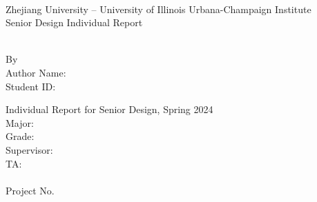 \documentclass[../individual_thesis.tex]{subfiles}
\begin{document}
\begin{titlepage}
    \begin{center}
        ~~\\ %
        \vspace{1.5cm}
        {\fontsize{16}{24}\selectfont Zhejiang University -- University of Illinois Urbana-Champaign Institute}\\
        \vspace{1.88cm}
        {\fontsize{28}{42}\selectfont Senior Design Individual Report}\\
        \vspace{1.6cm}
        \begin{minipage}{15.92cm}
            \centering
            \fontsize{26}{26}\selectfont
            \MakeUppercase{\bf \RPTTITLE}
        \end{minipage}\\[2cm]
        {\fontsize{14}{21}\selectfont By}\\[1.5em]
        {\fontsize{14}{21}\selectfont Author Name: \AUTHORNAME}\\
        {\fontsize{14}{21}\selectfont Student ID: \STUDENTID}

        \vfill
        {\fontsize{12}{\baselineskip}\selectfont Individual Report for Senior Design, Spring 2024\\
            Major: \MAJOR \\
            Grade: \GRADE \\
            Supervisor: \FACULTYNAME \\
            TA:~ \TANAME\\
            \vfill}
        {\fontsize{12}{18}\selectfont\RPTDATE\\
            Project No. \PROJNBR}
    \end{center}
    \vspace{2cm}
    ~
    \restoregeometry
\end{titlepage}
\thispagestyle{empty}
\end{document}
